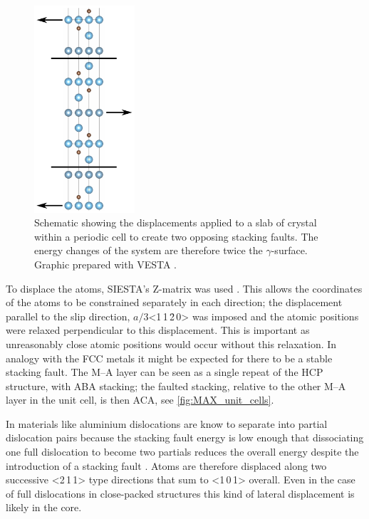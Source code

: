 \begin{figure}
\centering
\captionsetup{width=0.45\textwidth}
\includegraphics[width=0.3333\textwidth]{displacements_for_gamma_surface}
\caption[Schematic displacements during the simulation of the \texorpdfstring{$\gamma$}{gamma}-surface.]{Schematic showing the displacements applied to a slab of crystal within a periodic cell to create two opposing stacking faults. The energy changes of the system are therefore twice the $\gamma$-surface. Graphic prepared with VESTA \cite{Momma2011}.\label{fig:DFT_gamma_surface}}
\end{figure}

To displace the atoms, SIESTA's Z-matrix was used \cite{SIESTA_manual}. This allows the coordinates of the atoms to be constrained separately in each direction; the displacement parallel to the slip direction, $a/3$<1\,1\,\={2}\,0> was imposed and the atomic positions were relaxed perpendicular to this displacement. This is important as unreasonably close atomic positions would occur without this relaxation. In analogy with the FCC metals it might be expected for there to be a stable stacking fault. The M--A layer can be seen as a single repeat of the HCP structure, with ABA stacking; the faulted stacking, relative to the other M--A layer in the unit cell, is then ACA, see \autoref{fig:MAX_unit_cells}. 

In materials like aluminium dislocations are know to separate into partial dislocation pairs because the stacking fault energy is low enough that dissociating one full dislocation to become two partials reduces the overall energy despite the introduction of a stacking fault \cite{kelly2012ch9}. Atoms are therefore displaced along two successive <2\,1\,1> type directions that sum to <1\,0\,1> overall. Even in the case of full dislocations in close-packed structures this kind of lateral displacement is likely in the core. 

